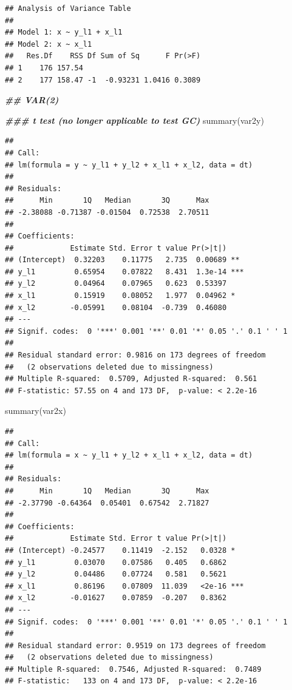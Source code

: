 \documentclass[
  12pt,
  oneside]{book}
\newenvironment{Shaded}{\begin{snugshade}}{\end{snugshade}}
\newcommand{\DocumentationTok}[1]{\textcolor[rgb]{0.56,0.35,0.01}{\textbf{\textit{#1}}}}
\newcommand{\FunctionTok}[1]{\textcolor[rgb]{0.00,0.00,0.00}{#1}}
\newcommand{\NormalTok}[1]{#1}
\begin{document}
\begin{verbatim}
## Analysis of Variance Table
## 
## Model 1: x ~ y_l1 + x_l1
## Model 2: x ~ x_l1
##   Res.Df    RSS Df Sum of Sq      F Pr(>F)
## 1    176 157.54                           
## 2    177 158.47 -1  -0.93231 1.0416 0.3089
\end{verbatim}

\begin{Shaded}
\begin{Highlighting}[]
\DocumentationTok{\#\# VAR(2)}

\DocumentationTok{\#\#\# t test (no longer applicable to test GC)}
\FunctionTok{summary}\NormalTok{(var2y)}
\end{Highlighting}
\end{Shaded}

\begin{verbatim}
## 
## Call:
## lm(formula = y ~ y_l1 + y_l2 + x_l1 + x_l2, data = dt)
## 
## Residuals:
##      Min       1Q   Median       3Q      Max 
## -2.38088 -0.71387 -0.01504  0.72538  2.70511 
## 
## Coefficients:
##             Estimate Std. Error t value Pr(>|t|)    
## (Intercept)  0.32203    0.11775   2.735  0.00689 ** 
## y_l1         0.65954    0.07822   8.431  1.3e-14 ***
## y_l2         0.04964    0.07965   0.623  0.53397    
## x_l1         0.15919    0.08052   1.977  0.04962 *  
## x_l2        -0.05991    0.08104  -0.739  0.46080    
## ---
## Signif. codes:  0 '***' 0.001 '**' 0.01 '*' 0.05 '.' 0.1 ' ' 1
## 
## Residual standard error: 0.9816 on 173 degrees of freedom
##   (2 observations deleted due to missingness)
## Multiple R-squared:  0.5709, Adjusted R-squared:  0.561 
## F-statistic: 57.55 on 4 and 173 DF,  p-value: < 2.2e-16
\end{verbatim}

\begin{Shaded}
\begin{Highlighting}[]
\FunctionTok{summary}\NormalTok{(var2x)}
\end{Highlighting}
\end{Shaded}

\begin{verbatim}
## 
## Call:
## lm(formula = x ~ y_l1 + y_l2 + x_l1 + x_l2, data = dt)
## 
## Residuals:
##      Min       1Q   Median       3Q      Max 
## -2.37790 -0.64364  0.05401  0.67542  2.71827 
## 
## Coefficients:
##             Estimate Std. Error t value Pr(>|t|)    
## (Intercept) -0.24577    0.11419  -2.152   0.0328 *  
## y_l1         0.03070    0.07586   0.405   0.6862    
## y_l2         0.04486    0.07724   0.581   0.5621    
## x_l1         0.86196    0.07809  11.039   <2e-16 ***
## x_l2        -0.01627    0.07859  -0.207   0.8362    
## ---
## Signif. codes:  0 '***' 0.001 '**' 0.01 '*' 0.05 '.' 0.1 ' ' 1
## 
## Residual standard error: 0.9519 on 173 degrees of freedom
##   (2 observations deleted due to missingness)
## Multiple R-squared:  0.7546, Adjusted R-squared:  0.7489 
## F-statistic:   133 on 4 and 173 DF,  p-value: < 2.2e-16
\end{verbatim}
\end{document}
